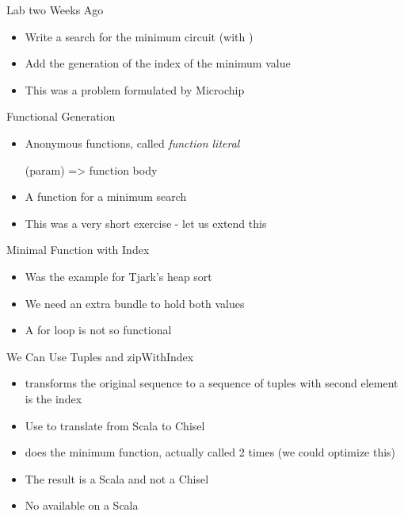 \begin{frame}[fragile]{Lab two Weeks Ago}
\begin{itemize}
\item Write a search for the minimum circuit (with )
\item Add the generation of the index of the minimum value
\item This was a problem formulated by Microchip
\end{itemize}
\end{frame}

\begin{frame}[fragile]{Functional Generation}
\begin{itemize}
\item Anonymous functions, called \emph{function literal}
\begin{chisel}
  (param) => function body
\end{chisel}
\item A function for a minimum search
\item This was a very short exercise - let us extend this
\end{itemize}
\end{frame}


\begin{frame}[fragile]{Minimal Function with Index}
\begin{itemize}
\item Was the example for Tjark's heap sort
\item We need an extra bundle to hold both values
\item A for loop is not so functional
\end{itemize}
\end{frame}

\begin{frame}[fragile]{We Can Use Tuples and zipWithIndex}
\begin{itemize}
\item {} transforms the original sequence to a sequence of tuples with second element is the index
\item Use  to translate from Scala  to Chisel 
\item {} does the minimum function, actually called 2 times (we could optimize this)
\item The result is a Scala  and not a Chisel 
\item No  available on a Scala 
\end{itemize}
\end{frame}


